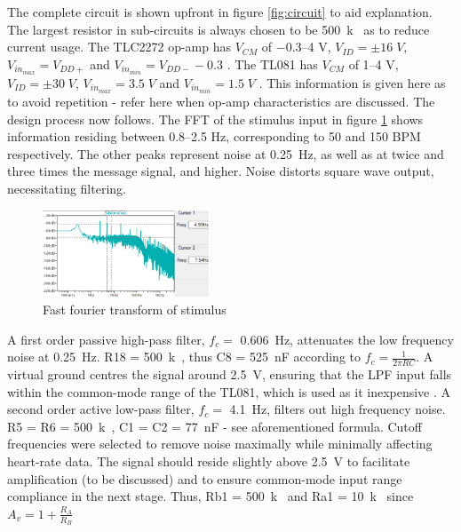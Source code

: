 The complete circuit is shown upfront in figure \ref{fig:circuit} to aid explanation. The largest resistor in sub-circuits is always chosen to be \SI{500}{k\Omega} as to reduce current usage. The TLC2272 op-amp has $V_{CM}$ of \numrange{-0.3}{4} \si{V}, $V_{ID} = \pm 16 \; V$, $V_{in_{max}} = V_{DD+}$ and $V_{in_{min}} = V_{DD-} - 0.3$ \cite{tlc2272}. The TL081 has $V_{CM}$ of \numrange{1}{4} \si{V}, $V_{ID} = \pm 30 \;V$, $V_{in_{max}} = 3.5 \;V$ and $V_{in_{min}} = 1.5 \;V$ \cite{tl081}. This information is given here as to avoid repetition - refer here when op-amp characteristics are discussed. The design process now follows.
The FFT of the stimulus input in figure \ref{fig:fft} shows information residing between \numrange{0.8}{2.5} \si{Hz}, corresponding to 50 and 150 BPM respectively. The other peaks represent noise at \SI{0.25}{Hz}, as well as at twice and three times the message signal, and higher. Noise distorts square wave output, necessitating filtering. 
\begin{figure}
    \centering
    \includegraphics[width = 0.44\textwidth]{./Figures/fft}
    \caption{Fast fourier transform of stimulus}
    \label{fig:fft}
\end{figure}
A first order passive high-pass filter, $f_c =$ \SI{0.606}{Hz}, attenuates the low frequency noise at \SI{0.25}{Hz}. R18 = \SI{500}{k\Omega}, thus C8 = \SI{525}{nF} according to $f_{c} = \frac{1}{2\pi R C}$. A virtual ground centres the signal around \SI{2.5}{V}, ensuring that the LPF input falls within the common-mode range of the TL081, which is used as it inexpensive \cite{octo}. A second order active low-pass filter, $f_c =$ \SI{4.1}{Hz}, filters out high frequency noise. R5 = R6 = \SI{500}{k\Omega}, C1 = C2 = \SI{77}{nF} - see aforementioned formula. Cutoff frequencies were selected to remove noise maximally while minimally affecting heart-rate data. The signal should reside slightly above \SI{2.5}{V} to facilitate amplification (to be discussed) and to ensure common-mode input range compliance in the next stage. Thus, Rb1 = \SI{500}{k\Omega} and Ra1 = \SI{10}{k\Omega} since $A_v=1+\frac{R_{A}}{R_{B}}$ 
